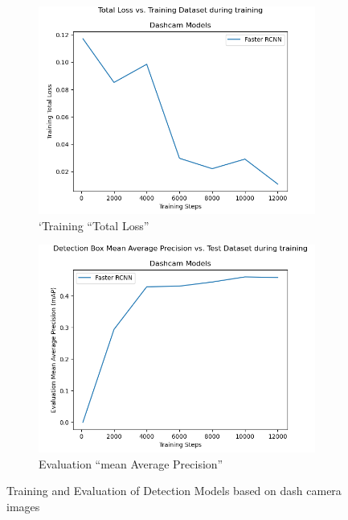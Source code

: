 \documentclass[11pt,twoside]{report}
\begin{document}
\begin{figure}[h]
\centering
\begin{subfigure}{0.45\textwidth}
	\includegraphics[width=\textwidth]{fig_dash_loss.png}
	\caption{`Training ``Total Loss''}
	\label{fig:rq3a}
\end{subfigure}
\hfill
\begin{subfigure}{0.45\textwidth}
	\includegraphics[width=\textwidth]{fig_dash_map.png}
	\caption{Evaluation ``mean Average Precision''}
	\label{fig:rq3b}
\end{subfigure}
\caption{Training and Evaluation of Detection Models based on dash camera images}
\label{fig:rq3}
\end{figure}
\end{document}
